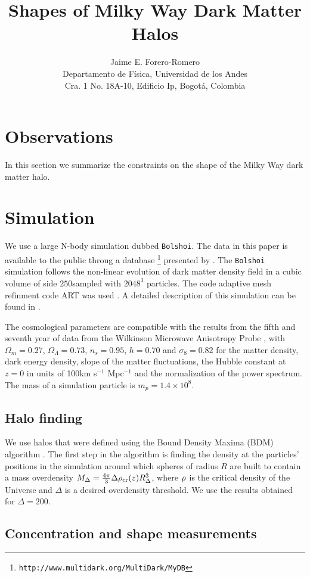\documentclass{article}
\title{Shapes of Milky Way Dark Matter Halos}
\author{Jaime E. Forero-Romero\\ Departamento de F\'{i}sica, Universidad de los Andes\\ Cra. 1 No. 18A-10, Edificio Ip, Bogot\'a, Colombia}
\newcommand{\hMsun}{{\ifmmode{h^{-1}{\rm {M_{\odot}}}}\else{$h^{-1}{\rm{M_{\odot}}}$}\fi}}
\newcommand{\hMpc}{{\ifmmode{h^{-1}{\rm Mpc}}\else{$h^{-1}$Mpc }\fi}}
\begin{document}
\maketitle



\section{Observations}

In this section we summarize the constraints on the shape of the Milky
Way dark matter halo.

   
\section{Simulation}\label{Simulations}

We use a large N-body simulation dubbed \verb"Bolshoi". The data in
this paper is available to the public throug a
database \footnote{\texttt{http://www.multidark.org/MultiDark/MyDB}}
presented by \cite{Riebe11}. The \verb"Bolshoi" simulation follows 
the non-linear evolution of dark matter density field in a cubic
volume of side $250$\hMpc sampled with $2048^3$ particles. The code
adaptive mesh refinment code ART was used  \citep{Klypin09}. A detailed
description of this simulation can be found in \cite{Bolshoi}.

The cosmological parameters are compatible with the results from the
fifth and seventh year of data from the Wilkinson Microwave Anisotropy
Probe \citep{Komatsu2009,Jarosik2011}, with $\Omega_m=0.27$,
$\Omega_{\Lambda}=0.73$, $n_{s}=0.95$, $h=0.70$ and $\sigma_8=0.82$
for the matter density, dark energy density, slope of the matter
fluctuations, the Hubble constant at $z=0$ in units of 100km s$^{-1}$
Mpc$^{-1}$ and the normalization of the power spectrum. The mass of a
simulation particle is $m_p = 1.4\times 10^{8}$\hMsun. 


\subsection{Halo finding}

We use halos that were defined using the Bound Density Maxima (BDM)
algorithm \citep{KlypinBDM}. The first step in the algorithm is
finding the density at the particles' positions in the simulation
around which spheres of radius $R$ are built to contain a mass
overdensity $M_{\Delta} = \frac{4\pi}{3}\Delta \rho_{\rm
  cr}(z)R_{\Delta}^{3}$, where $\rho_{\rm}$ is the critical density of
the Universe and $\Delta$ is a desired overdensity threshold. We use
the results obtained for $\Delta=200$.


\subsection{Concentration and shape measurements}




\end{document}
